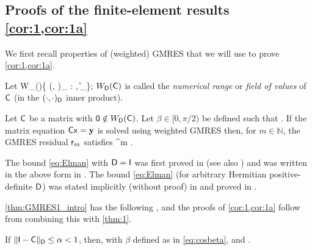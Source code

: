 \subsection{Proofs of the finite-element results \cref{cor:1,cor:1a}}\label{sec:mainproofs}

We first recall properties of (weighted) GMRES that we will use to prove \cref{cor:1,cor:1a}.

Let 
\beq\label{eq:fov}
W_\Dmat(\matrixC)\de \Big\{ (\matrixC \xvec, \xvec)_{\Dmat} : \xvec \in \CCN, \|\xvec\|_\Big\};
\eeq
$W_{\mathsf{D}}(\mathsf{C})$ is called the \emph{numerical range} or \emph{field of values} of $\mathsf{C}$ (in the $(\cdot,\cdot)_{\mathsf{D}}$ inner product).


\begin{theorem}\label{thm:GMRES1_intro} 
Let $\mathsf{C}$ be a matrix with $\mathsf{0}\notin W_{\mathsf{D}}(\mathsf{C})$. Let $\beta\in[0,\pi/2)$ be defined such that
\beq\label{eq:cosbeta}
\cos \beta \de {}.
\eeq
If the matrix equation $\mathsf{C} \mathsf{x} = \mathbf{y}$ is solved using weighted GMRES then, 
for $m\in \mathbb{N}$, the GMRES residual $\mathsf{r}_{m}$ %
satisfies
\beq\label{eq:Elman}
\frac{\N{\rvecm}_{\Dmat}}{\N{\rvecz}_{\Dmat}} \leq \sin^m \beta. %
\eeq
\end{theorem}
The bound \cref{eq:Elman} with $\mathsf{D}=\mathsf{I}$ was first proved in \cite[Theorem 6.3]{El:82} (see also \cite[Theorem 3.3]{EiElSc:83}) and was written in the above form in \cite[Equation 1.2]{BeGoTy:06}. The bound \cref{eq:Elman} (for arbitrary Hermitian positive-definite $\mathsf{D}$) was stated implicitly (without proof) in \cite[p. 247]{CaWi:92} and proved in \cite[Theorem 5.1]{GrSpVa:17}. %



\cref{thm:GMRES1_intro} has the following , and the proofs of \cref{cor:1,cor:1a} follow from combining this with \cref{thm:1}.

\begin{corollary}
\label{cor:GMRES_intro} 
If $\|\mathsf{I} - \mathsf{C} \|_{\mathsf{D}} \leq \alpha < 1$, then, with $\beta$ defined as in \cref{eq:cosbeta},
\beqs
\cos \beta \geq {}\eeqs
and
\beq\label{eq:gmressin}
\sin \beta \leq {}.
\eeq
\end{corollary}

